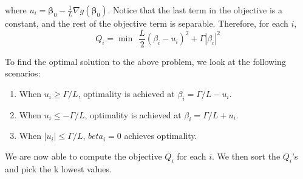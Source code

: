 \documentclass[12pt]{article}
\newcommand{\B}{\boldsymbol}
\newcommand{\1}{\mathds{1}}
\begin{document}
where $u_i = \B\beta_0 - \frac{1}{L}\nabla g(\B\beta_0)$. Notice that the last term in the objective is a constant, and the rest of the objective term is separable. Therefore, for each $i$,
\begin{equation}
Q_i = \min ~~ \frac{L}{2} (\beta_i - u_i)^2+ \Gamma | \beta_i |^2
\end{equation}

To find the optimal solution to the above problem, we look at the following scenarios:
\begin{enumerate}
\item When $u_i \geq \Gamma/L$, optimality is achieved at $\beta_i = \Gamma/L - u_i$.
\item When $u_i \leq - \Gamma/L$, optimality is achieved at $\beta_i = \Gamma/L + u_i$.  
\item When $|u_i| \leq \Gamma/L$, $beta_i = 0$ achieves optimality.
\end{enumerate} 

We are now able to compute the objective $Q_i$ for each $i$. We then sort the $Q_i$'s and pick the k lowest values.
\end{document}
